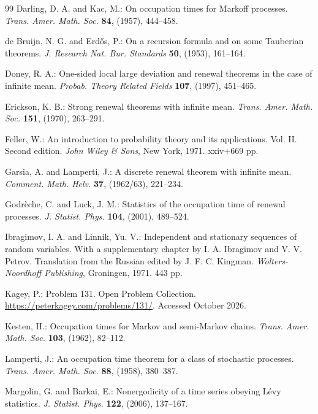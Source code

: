 \documentclass[EJP,preprint]{ejpecp}
\theoremstyle{ejpecpbodyit}
\begin{document}
\begin{thebibliography}{99}
 Darling, D. A. and Kac, M.: On occupation times for Markoff
  processes. \emph{Trans. Amer. Math. Soc.} \textbf{84}, (1957), 444--458. 

 de Bruijn, N. G. and Erd\H{o}s, P.: On a recursion
  formula and on some Tauberian theorems. \emph{J. Research Nat. Bur.
  Standards} \textbf{50}, (1953), 161--164. 

 Doney, R. A.: One-sided local large deviation and renewal
  theorems in the case of infinite mean. \emph{Probab. Theory Related Fields}
  \textbf{107}, (1997), 451--465. 

 Erickson, K. B.: Strong renewal theorems with infinite
  mean. \emph{Trans. Amer. Math. Soc.} \textbf{151}, (1970), 263--291. 

 Feller, W.: An introduction to probability theory and its
  applications. Vol. II. Second edition. \emph{John Wiley \& Sons}, New York,
  1971. xxiv+669 pp. 

 Garsia, A. and Lamperti, J.: A discrete renewal
  theorem with infinite mean. \emph{Comment. Math. Helv.} \textbf{37},
  (1962/63), 221--234. 

 Godr\`eche, C. and Luck, J. M.: Statistics of the
  occupation time of renewal processes. \emph{J. Statist. Phys.}
  \textbf{104}, (2001), 489--524. 

 Ibragimov, I. A. and Linnik, Yu. V.:
  Independent and stationary sequences of random variables. With a
  supplementary chapter by I. A. Ibragimov and V. V. Petrov. Translation from
  the Russian edited by J. F. C. Kingman. \emph{Wolters-Noordhoff Publishing},
  Groningen, 1971. 443 pp. 

 Kagey, P.: Problem 131. Open Problem Collection.
  \url{https://peterkagey.com/problems/131/}. Accessed October 2026.

 Kesten, H.: Occupation times for Markov and semi-Markov
  chains. \emph{Trans. Amer. Math. Soc.} \textbf{103}, (1962), 82--112.

 Lamperti, J.: An occupation time theorem for a class of
  stochastic processes. \emph{Trans. Amer. Math. Soc.} \textbf{88}, (1958),
  380--387. 

 Margolin, G. and Barkai, E.: Nonergodicity of a
  time series obeying L\'evy statistics. \emph{J. Statist. Phys.} \textbf{122},
  (2006), 137--167. 


\end{thebibliography}
\end{document}
